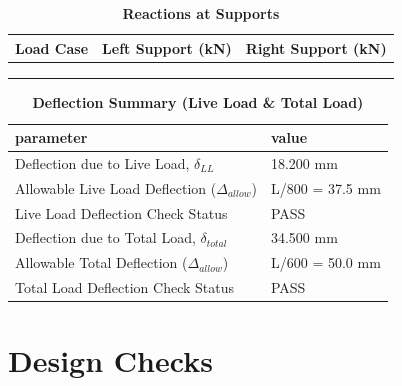 \documentclass[12pt,a4paper]{report}
\numberwithin{table}{chapter}
\numberwithin{figure}{chapter}
\begin{document}
\vspace{1em}
\begin{longtable}{|>{\centering\arraybackslash}p{5.2cm}|>{\centering\arraybackslash}p{5.2cm}|>{\centering\arraybackslash}p{5.2cm}|}
\caption{\textbf{Reactions at Supports}}
\hline
\textbf{Load Case} & \textbf{Left Support (kN)} & \textbf{Right Support (kN)} \\[6pt]
\hline
 &  &  \\[6pt]
\hline
 &  &  \\[6pt]
\hline
 &  &  \\[6pt]
\hline
\end{longtable}

\vspace{1em}
\begin{longtable}{|L{7cm}|p{8.5cm}|}
\caption{\textbf{Deflection Summary (Live Load \& Total Load)}}
\hline
\textbf{parameter} & \textbf{value} \\
\hline
\textnormal{Deflection due to Live Load, $\delta_{LL}$} & 18.200 mm \\[6pt]
\hline
\textnormal{Allowable Live Load Deflection ($\Delta_{allow}$)} & L/800 = 37.5 mm \\[6pt]
\hline
\textnormal{Live Load Deflection Check Status} & PASS \\[6pt]
\hline
\textnormal{Deflection due to Total Load, $\delta_{total}$} & 34.500 mm \\[6pt]
\hline
\textnormal{Allowable Total Deflection ($\Delta_{allow}$)} & L/600 = 50.0 mm \\[6pt]
\hline
\textnormal{Total Load Deflection Check Status} & PASS \\[6pt]
\hline
\end{longtable}

\vspace{1em}
\noindent
\noindent{}
\noindent{}
\noindent{}


\chapter{Design Checks}
\end{document}
